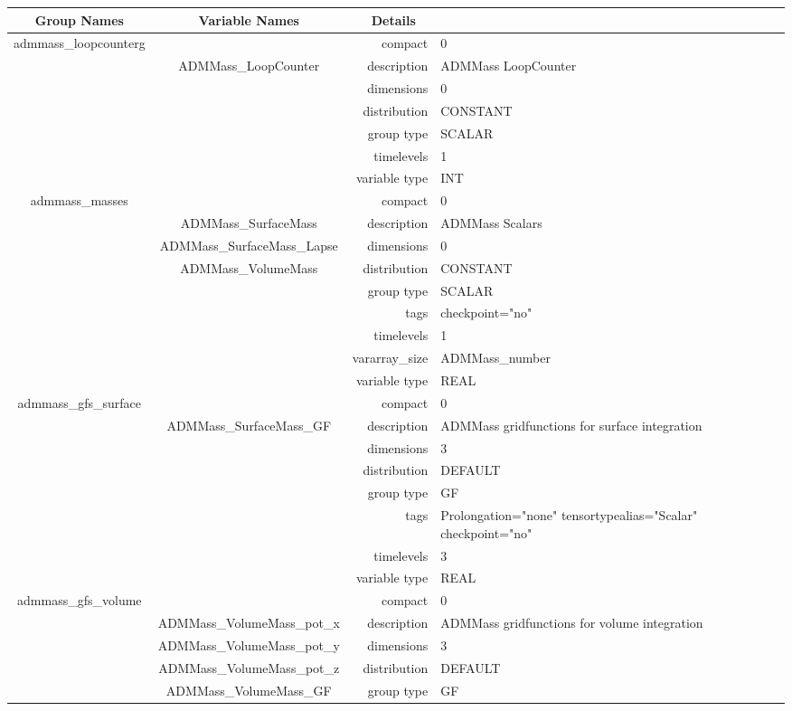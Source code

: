 \begin{tabular*}{150mm}{|c|c@{\extracolsep{\fill}}|rl|} \hline 
~ {\bf Group Names} ~ & ~ {\bf Variable Names} ~  &{\bf Details} ~ & ~\\ 
\hline 
admmass\_loopcounterg &  & compact & 0 \\ 
 & ADMMass\_LoopCounter & description & ADMMass LoopCounter \\ 
 &  & dimensions & 0 \\ 
 &  & distribution & CONSTANT \\ 
 &  & group type & SCALAR \\ 
 &  & timelevels & 1 \\ 
 &  & variable type & INT \\ 
\hline 
admmass\_masses &  & compact & 0 \\ 
 & ADMMass\_SurfaceMass & description & ADMMass Scalars \\ 
 & ADMMass\_SurfaceMass\_Lapse & dimensions & 0 \\ 
 & ADMMass\_VolumeMass & distribution & CONSTANT \\ 
 &  & group type & SCALAR \\ 
 &  & tags & checkpoint="no" \\ 
 &  & timelevels & 1 \\ 
 &  & vararray\_size & ADMMass\_number \\ 
 &  & variable type & REAL \\ 
\hline 
admmass\_gfs\_surface &  & compact & 0 \\ 
 & ADMMass\_SurfaceMass\_GF & description & ADMMass gridfunctions for surface integration \\ 
 &  & dimensions & 3 \\ 
 &  & distribution & DEFAULT \\ 
 &  & group type & GF \\ 
 &  & tags & Prolongation="none" tensortypealias="Scalar" checkpoint="no" \\ 
 &  & timelevels & 3 \\ 
 &  & variable type & REAL \\ 
\hline 
admmass\_gfs\_volume &  & compact & 0 \\ 
 & ADMMass\_VolumeMass\_pot\_x & description & ADMMass gridfunctions for volume integration \\ 
 & ADMMass\_VolumeMass\_pot\_y & dimensions & 3 \\ 
 & ADMMass\_VolumeMass\_pot\_z & distribution & DEFAULT \\ 
 & ADMMass\_VolumeMass\_GF & group type & GF \\ 

\end{tabular*}
